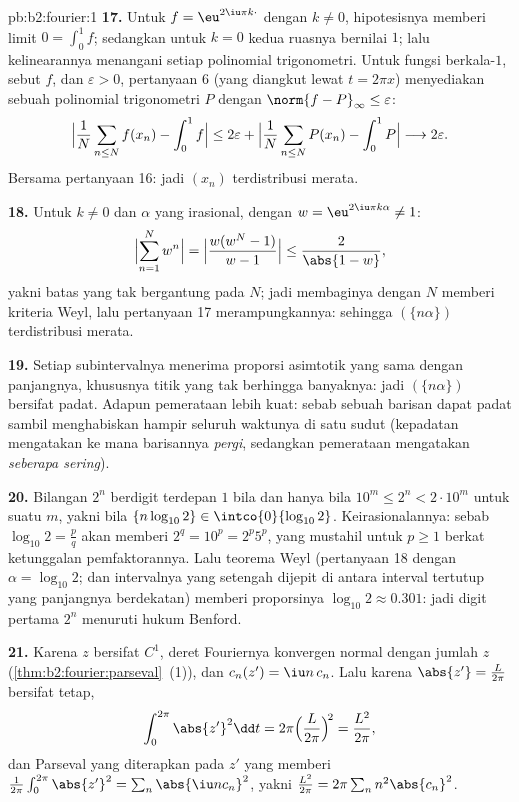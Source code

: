 \begin{solution}{pb:b2:fourier:1}
\textbf{17.} Untuk $f = \eu^{2\iu\pi k\cdot}$ dengan $k \neq 0$,
hipotesisnya memberi limit $0 = \int_0^1f$; sedangkan untuk $k = 0$ kedua
ruasnya bernilai $1$; lalu kelinearannya menangani setiap polinomial
trigonometri. Untuk fungsi  berkala-$1$, sebut $f$, dan $\varepsilon >
0$, pertanyaan 6 (yang diangkut lewat $t = 2\pi x$) menyediakan sebuah
polinomial trigonometri $P$ dengan $\norm{f - P}_\infty \leq
\varepsilon$:
\[
\Bigl|\frac1N\sum_{n\leq N}f(x_n) - \int_0^1f\Bigr|
\leq 2\varepsilon +
\Bigl|\frac1N\sum_{n\leq N}P(x_n) - \int_0^1P\Bigr|
\longrightarrow 2\varepsilon .
\]
Bersama pertanyaan 16: jadi $(x_n)$ terdistribusi merata.

\textbf{18.} Untuk $k \neq 0$ dan $\alpha$ yang irasional, dengan $w =
\eu^{2\iu\pi k\alpha} \neq 1$:
\[
\Bigl|\sum_{n=1}^{N}w^n\Bigr|
= \Bigl|\frac{w(w^N - 1)}{w - 1}\Bigr|
\leq \frac{2}{\abs{1 - w}} ,
\]
yakni batas yang tak bergantung pada $N$; jadi membaginya dengan $N$ memberi kriteria
Weyl, lalu pertanyaan 17 merampungkannya: sehingga $(\{n\alpha\})$
terdistribusi merata.

\textbf{19.} Setiap subintervalnya menerima proporsi asimtotik yang
sama dengan panjangnya, khususnya titik yang tak berhingga banyaknya: jadi
$(\{n\alpha\})$ bersifat padat. Adapun pemerataan lebih kuat: sebab sebuah
barisan dapat padat sambil menghabiskan hampir seluruh waktunya di satu
sudut (kepadatan mengatakan ke mana barisannya \emph{pergi},
sedangkan pemerataan mengatakan \emph{seberapa sering}).

\textbf{20.} Bilangan $2^n$ berdigit terdepan $1$ bila dan hanya bila $10^m \leq 2^n <
2\cdot10^m$ untuk suatu $m$, yakni bila $\{n\log_{10}2\} \in
\intco{0}{\log_{10}2}$. Keirasionalannya: sebab $\log_{10}2 =
\frac pq$ akan memberi $2^q = 10^p = 2^p5^p$, yang mustahil untuk $p
\geq 1$ berkat ketunggalan pemfaktorannya. Lalu teorema Weyl (pertanyaan 18
dengan $\alpha = \log_{10}2$; dan intervalnya yang setengah  dijepit
di antara interval tertutup yang panjangnya berdekatan) memberi proporsinya
$\log_{10}2 \approx 0.301$: jadi digit pertama $2^n$ menuruti
hukum Benford.

\textbf{21.} Karena $z$ bersifat $C^1$, deret Fouriernya konvergen
normal dengan jumlah $z$ (\cref{thm:b2:fourier:parseval}~(1)),
dan $c_n(z') = \iu n\,c_n$. Lalu karena $\abs{z'} = \frac{L}{2\pi}$
bersifat tetap,
\[
\int_0^{2\pi}\abs{z'}^2\dd t
= 2\pi\Bigl(\frac{L}{2\pi}\Bigr)^{\!2}
= \frac{L^2}{2\pi} ,
\]
dan Parseval yang diterapkan pada $z'$ yang  memberi
$\frac{1}{2\pi}\int_0^{2\pi}\abs{z'}^2 =
\sum_n\abs{\iu nc_n}^2$, yakni $\frac{L^2}{2\pi} = 2\pi\sum_n
n^2\abs{c_n}^2$.


\end{solution}
